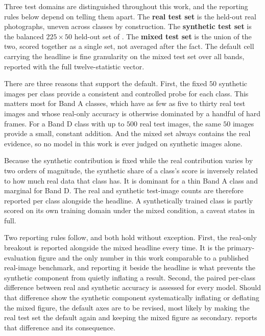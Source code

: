 Three test domains are distinguished throughout this work, and the reporting rules below depend on telling them apart. The \textbf{real test set} is the held-out real photographs, uneven across classes by construction. The \textbf{synthetic test set} is the balanced $225 \times 50$ held-out set of . The \textbf{mixed test set} is the union of the two, scored together as a single set, not averaged after the fact. The default cell carrying the headline is fine granularity on the mixed test set over all bands, reported with the full twelve-statistic vector.

There are three reasons that support the default. First, the fixed $50$ synthetic images per class provide a consistent and controlled probe for each class. This matters most for Band A classes, which have as few as five to thirty real test images and whose real-only accuracy is otherwise dominated by a handful of hard frames. For a Band D class with up to $500$ real test images, the same $50$ images provide a small, constant addition. And the mixed set always contains the real evidence, so no model in this work is ever judged on synthetic images alone.

Because the synthetic contribution is fixed while the real contribution varies by two orders of magnitude, the synthetic share of a class's score is inversely related to how much real data that class has. It is dominant for a thin Band A class and marginal for Band D. The real and synthetic test-image counts are therefore reported per class alongside the headline. A synthetically trained class is partly scored on its own training domain under the mixed condition, a caveat  states in full.

Two reporting rules follow, and both hold without exception. First, the real-only breakout is reported alongside the mixed headline every time. It is the primary-evaluation figure and the only number in this work comparable to a published real-image benchmark, and reporting it beside the headline is what prevents the synthetic component from quietly inflating a result. Second, the paired per-class difference between real and synthetic accuracy is assessed for every model. Should that difference show the synthetic component systematically inflating or deflating the mixed figure, the default axes are to be revised, most likely by making the real test set the default again and keeping the mixed figure as secondary.  reports that difference and its consequence.

